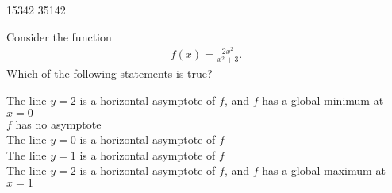\documentclass[12pt]{amsart}
\begin{document}
\runType[final]

\begin{answersheetmatter}
\whichCourse[Math 10550] \whichExam[Quiz I]
\dateOfExam[10/25/2011]
\lengthOfTimeForExam[5  min]

\begin{multiplechoiceStyle}[dotted]
 15342   35142 
\end{multiplechoiceStyle}
\end{answersheetmatter}


\makeanswersheet[]

\begin{exam}
\multiplechoiceStart[5 pts.]

\gdef\dxd{\displaystyle}


\begin{problem}
    Consider the function
    \begin{equation*}
    \begin{split}
    f(x) = \frac{2x^{2}}{x^{2} + 3}.
    \end{split}
    \end{equation*}
    Which of the following statements is true?
\begin{answers}{1}
The line $y = 2$ is a horizontal asymptote of $f$, and $f$ has a global minimum at $x = 0$ \\
$f$ has no asymptote \\
The line $y = 0$ is a horizontal asymptote of $f$\\
The line $y = 1$ is a horizontal asymptote of $f$ \\
The line $y = 2$ is a horizontal asymptote of $f$, and $f$ has a global maximum at $x =1$ \\
\end{answers}
\end{problem}


\end{exam}
\end{document}
